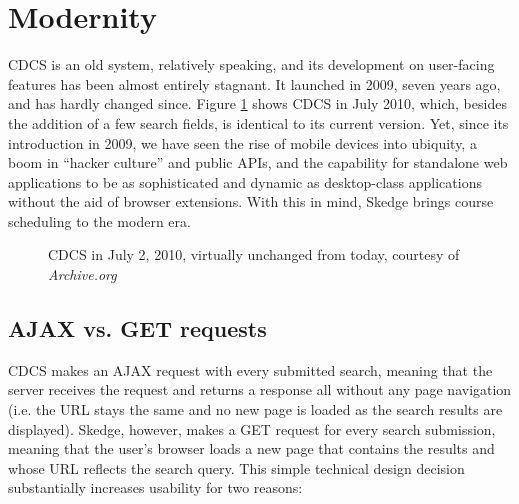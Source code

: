 
\section{Modernity}

CDCS is an old system, relatively speaking, and its development on user-facing features has been almost entirely stagnant. It launched in 2009, seven years ago, and has hardly changed since. Figure \ref{fig:cdcs2010} shows CDCS in July 2010, which, besides the addition of a few search fields, is identical to its current version. Yet, since its introduction in 2009, we have seen the rise of mobile devices into ubiquity, a boom in ``hacker culture'' and public APIs, and the capability for standalone web applications to be as sophisticated and dynamic as desktop-class applications without the aid of browser extensions. With this in mind, Skedge brings course scheduling to the modern era.

\begin{figure}[ht]
  \centering
  \caption[CDCS in July 2, 2010]{CDCS in July 2, 2010, virtually unchanged from today, courtesy of \emph{Archive.org}}
  \label{fig:cdcs2010}
\end{figure}

\subsection{AJAX vs. GET requests}

CDCS makes an AJAX request with every submitted search, meaning that the server receives the request and returns a response all without any page navigation (i.e. the URL stays the same and no new page is loaded as the search results are displayed). Skedge, however, makes a GET request for every search submission, meaning that the user's browser loads a new page that contains the results and whose URL reflects the search query. This simple technical design decision substantially increases usability for two reasons:

